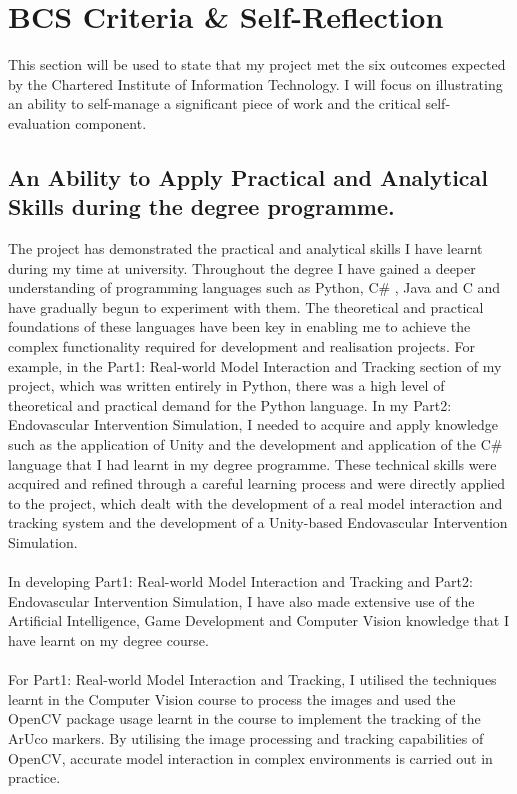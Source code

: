 \documentclass[12pt]{article}
\begin{document}
\section{BCS Criteria \& Self-Reflection}
This section will be used to state that my project met the six outcomes expected by the Chartered Institute of Information Technology\cite{BCS2020}.
I will focus on illustrating an ability to self-manage a significant piece of work and the critical self-evaluation component.
\subsection{An Ability to Apply Practical and Analytical Skills during the degree programme.}
The project has demonstrated the practical and analytical skills I have learnt during my time at university. Throughout the degree I have gained a deeper understanding of programming languages such as Python, C\# , Java and C\+\+ and have gradually begun to experiment with them. The theoretical and practical foundations of these languages have been key in enabling me to achieve the complex functionality required for development and realisation projects. For example, in the Part1: Real-world Model Interaction and Tracking section of my project, which was written entirely in Python, there was a high level of theoretical and practical demand for the Python language. In my Part2: Endovascular Intervention Simulation, I needed to acquire and apply knowledge such as the application of Unity and the development and application of the C\# language that I had learnt in my degree programme. These technical skills were acquired and refined through a careful learning process and were directly applied to the project, which dealt with the development of a real model interaction and tracking system and the development of a Unity-based Endovascular Intervention Simulation.
\\\\
In developing Part1: Real-world Model Interaction and Tracking and Part2: Endovascular Intervention Simulation, I have also made extensive use of the Artificial Intelligence, Game Development and Computer Vision knowledge that I have learnt on my degree course.
\\\\
For Part1: Real-world Model Interaction and Tracking, I utilised the techniques learnt in the Computer Vision course to process the images and used the OpenCV package usage learnt in the course to implement the tracking of the ArUco markers. By utilising the image processing and tracking capabilities of OpenCV, accurate model interaction in complex environments is carried out in practice.
\end{document}
